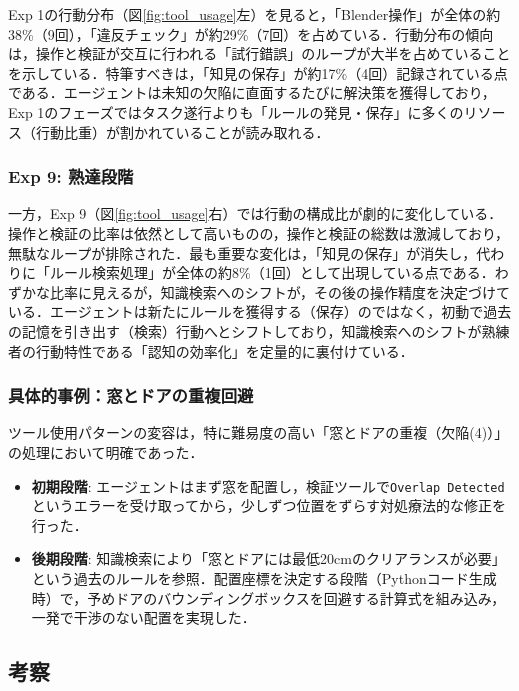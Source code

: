 \documentclass[dvipdfmx, a4paper, 9pt]{deimj}
\begin{document}
Exp 1の行動分布（図\ref{fig:tool_usage}左）を見ると，「Blender操作」が全体の約38\%（9回），「違反チェック」が約29\%（7回）を占めている．行動分布の傾向は，操作と検証が交互に行われる「試行錯誤」のループが大半を占めていることを示している．特筆すべきは，「知見の保存」が約17\%（4回）記録されている点である．エージェントは未知の欠陥に直面するたびに解決策を獲得しており，Exp 1のフェーズではタスク遂行よりも「ルールの発見・保存」に多くのリソース（行動比重）が割かれていることが読み取れる．

\subsubsection{Exp 9: 熟達段階}

一方，Exp 9（図\ref{fig:tool_usage}右）では行動の構成比が劇的に変化している．操作と検証の比率は依然として高いものの，操作と検証の総数は激減しており，無駄なループが排除された．最も重要な変化は，「知見の保存」が消失し，代わりに「ルール検索処理」が全体の約8\%（1回）として出現している点である．わずかな比率に見えるが，知識検索へのシフトが，その後の操作精度を決定づけている．エージェントは新たにルールを獲得する（保存）のではなく，初動で過去の記憶を引き出す（検索）行動へとシフトしており，知識検索へのシフトが熟練者の行動特性である「認知の効率化」を定量的に裏付けている．

\subsubsection{具体的事例：窓とドアの重複回避}

ツール使用パターンの変容は，特に難易度の高い「窓とドアの重複（欠陥(4)）」の処理において明確であった．

\begin{itemize}
  \item \textbf{初期段階}: エージェントはまず窓を配置し，検証ツールで\texttt{Overlap Detected}というエラーを受け取ってから，少しずつ位置をずらす対処療法的な修正を行った．
  \item \textbf{後期段階}: 知識検索により「窓とドアには最低20cmのクリアランスが必要」という過去のルールを参照．配置座標を決定する段階（Pythonコード生成時）で，予めドアのバウンディングボックスを回避する計算式を組み込み，一発で干渉のない配置を実現した．
\end{itemize}

\subsection{考察}
\end{document}
